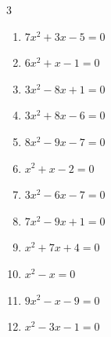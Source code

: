 \begin{multicols}{3}
\begin{enumerate}

  \item $7x^{2}+3x-5=0$


  \item $6x^{2}+x-1=0$


  \item $3x^{2}-8x+1=0$


  \item $3x^{2}+8x-6=0$


  \item $8x^{2}-9x-7=0$


\columnbreak %

  \item $x^{2}+x-2=0$

        \phantom{$\displaystyle x=1, \; -2$}

  \item $3x^{2}-6x-7=0$


  \item $7x^{2}-9x+1=0$


  \item $x^{2}+7x+4=0$


  \item $x^{2}-x=0$

        \phantom{$\displaystyle x=1, \; 0$}

  \item $9x^{2}-x-9=0$


  \item $x^{2}-3x-1=0$



\end{enumerate}
\end{multicols}
